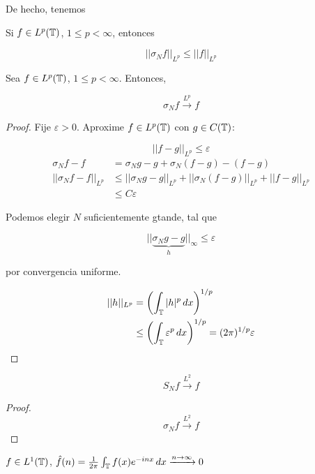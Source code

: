 De hecho, tenemos 

\begin{fproposition}
    Si $f\in L^p(\mathbb{T})$, $1\leq p<\infty$, entonces 

    \[||\sigma_N f||_{L^p}\leq ||f||_{L^p}\]
\end{fproposition}

\begin{ftheorem}
    Sea $f\in L^p(\mathbb{T})$, $1\leq p<\infty$. Entonces,

    \[\sigma_N f\xrightarrow{L^p} f\]
\end{ftheorem}

\begin{proof}
    Fije $\varepsilon>0$. Aproxime $f\in L^p(\mathbb{T})$ con $g\in C(\mathbb{T})$:

    \[||f-g||_{L^p}\leq \varepsilon\]
    \begin{align*}
        \sigma_N f-f&=\sigma_N g-g +\sigma_N (f-g)-(f-g)\\
        ||\sigma_N f-f||_{L^p}&\leq ||\sigma_N g-g||_{L^p}+||\sigma_N (f-g)||_{L^p}+||f-g||_{L^p}\\
        &\leq C\varepsilon
    \end{align*}

    Podemos elegir $N$ suficientemente gtande, tal que 

    \[||\underbrace{\sigma_N g-g}_{h}||_{\infty}\leq \varepsilon\]

    por convergencia uniforme.

    \begin{align*}
        ||h||_{L^p}&=\left(\int_{\mathbb{T}} |h|^p\,dx\right)^{1/p}\\
        &\leq \left(\int_{\mathbb{T}} \varepsilon^p\,dx\right)^{1/p}=(2\pi)^{1/p}\varepsilon
    \end{align*}
\end{proof}

\begin{fcorollary}
    \[S_N f\xrightarrow{L^2} f\]
\end{fcorollary}

\begin{proof}
    \[\sigma_N f\xrightarrow{L^2}f\]
\end{proof}

\begin{flemma}
    $f\in L^1(\mathbb{T})$, $\hat f(n)=\frac{1}{2\pi}\int_{\mathbb{T}} f(x)e^{-inx}\,dx\xrightarrow{n\to\infty} 0$
\end{flemma}

